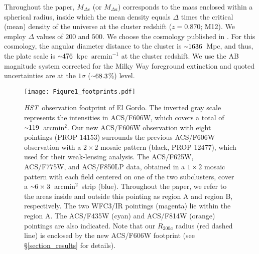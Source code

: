 \documentclass[twocolumn]{aastex631}
\newcommand{\elgordo}{El Gordo}
\newcommand{\HST}{{\it HST}}
\newcommand{\mytilde}{\raise.19ex\hbox{$\scriptstyle\sim$}}
\newcommand{\sqarcmin}{arcmin$^{2}$}
\begin{document}
Throughout the paper, $M_{\Delta c}$ (or $M_{\Delta a}$) corresponds to the mass enclosed within a spherical radius, inside which the mean density equals $\Delta$ times the critical (mean) density of the universe at the cluster redshift ($z=0.870$; M12). We employ $\Delta$ values of $200$ and $500$. 
We choose the cosmology published in \cite{Planck2016}. For this cosmology, the angular diameter distance to the cluster is $\mytilde1636$~Mpc, and thus, the plate scale is $\mytilde476$~kpc~$\mbox{arcmin}^{-1}$ at the cluster redshift. 
We use the AB magnitude system corrected for the Milky Way foreground extinction and quoted uncertainties are at the $1\sigma$ ($\mytilde68.3$\%) level.




\begin{figure}
\centering
\texttt{[image: Figure1\_footprints.pdf]}
\caption{\HST~observation footprint of \elgordo. The inverted gray scale represents the intensities in ACS/F606W, which covers a total of $\mytilde119$~\sqarcmin. Our new ACS/F606W observation with eight pointings (PROP 14153) surrounds the previous ACS/F606W observation with a $2\times2$ mosaic pattern (black, PROP 12477), which \cite{Jee2014} used for their weak-lensing analysis. The ACS/F625W, ACS/F775W, and ACS/F850LP data, obtained in a $1\times2$ mosaic pattern with each field centered on one of the two subclusters, cover a $\mytilde6\times3$~\sqarcmin~strip (blue). Throughout the paper, we refer to the areas inside and outside this pointing as region A and region B, respectively. The two WFC3/IR pointings (magenta) lie within the region A. The ACS/F435W (cyan) and ACS/F814W (orange) pointings are also indicated. Note that our $R_{200a}$ radius (red dashed line) is enclosed by the new ACS/F606W footprint (see \S\ref{section_results} for details). }
\label{fig:El_Gordo_field}
\end{figure}
\end{document}
